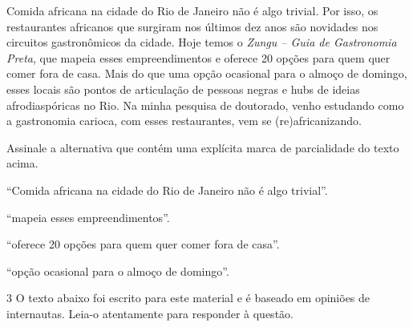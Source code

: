 \begin{myquote}
Comida africana na cidade do Rio de Janeiro não é algo trivial. Por isso, os
restaurantes africanos que surgiram nos últimos dez anos são novidades nos
circuitos gastronômicos da cidade. Hoje temos o \textit{Zungu -- Guia de Gastronomia
Preta}, que mapeia esses empreendimentos e oferece 20 opções para quem quer
comer fora de casa. Mais do que uma opção ocasional para o almoço de domingo,
esses locais são pontos de articulação de pessoas negras e hubs de ideias
afrodiaspóricas no Rio. Na minha pesquisa de doutorado, venho estudando como a
gastronomia carioca, com esses restaurantes, vem se (re)africanizando.

\end{myquote}

Assinale a alternativa que contém uma explícita marca de parcialidade do texto acima.

\begin{escolha}

  \item ``Comida africana na cidade do Rio de Janeiro não é algo trivial''.
  
  \item ``mapeia esses empreendimentos''.
  
  \item ``oferece 20 opções para quem quer comer fora de casa''.
  
  \item ``opção ocasional para o almoço de domingo''.

\end{escolha}

\num{3} O texto abaixo foi escrito para este material e é baseado em opiniões
de internautas. Leia-o atentamente para responder à questão.


